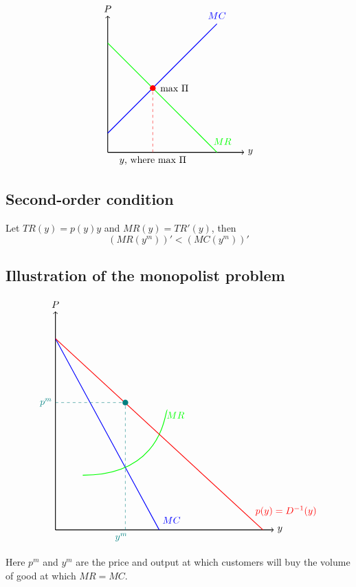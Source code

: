 \documentclass[a4paper, 10pt]{article}
\begin{document}
$$\begin{tikzpicture}[scale=2]

    \draw[thick,->] (0,0) -- (2.5,0) node[right] {$y$}; 
    \draw[thick,->] (0,0) -- (0,2.5) node[above] {$P$}; 

    \draw[thick, green] (0,2) -- (2,0);
    \draw[thick, blue] (0,0.35) -- (2,2.35);
    
    \fill[red] (0.825,1.175) circle (1.5pt);
    \node[anchor=west, black] at (0.9,1.175) {max $\Pi$};

    \draw[dashed, red] (0.825,0) -- (0.825,1.175);

    \node[black] at (0.825,-0.15) {$y$, where max $\Pi$};
    \node[blue] at (2,2.5) {$MC$};
    \node[green] at (2.1,0.2) {$MR$};

\end{tikzpicture}$$
\subsection{Second-order condition}
Let $TR(y)=p(y)y$ and $MR(y)=TR'(y)$, then
\begin{equation}
    \left(MR(y^m)\right)'<\left(MC(y^m)\right)'
\end{equation}
\subsection{Illustration of the monopolist problem}
$$
\begin{tikzpicture}[scale=2]

    \draw[thick,->] (0,0) -- (4,0) node[right] {$y$}; 
    \draw[thick,->] (0,0) -- (0,4) node[above] {$P$};

    \draw[thick, blue] (0,3.5) -- (1.9,0); %
    \draw[thick, green] (0.5,1) .. controls (2,1) and (2,2.2) .. (2.05,2.2); %
    \draw[thick, red] (0,3.5) -- (3.8,0);

    \fill[teal] (1.28,2.33) circle (1.5pt);


    \draw[dashed, teal] (1.28,0) -- (1.28,2.33);
    \draw[dashed, teal] (0,2.33) -- (1.28,2.33);
    \node[anchor=east, teal] at (0,2.33) {$p^m$};
    \node[anchor=north east, teal] at (1.38,0) {$y^m$};
    \node[anchor=north west, blue] at (1.9,0.3) {$MC$};
    \node[anchor=north west, red] at (3.6,0.5) {$p(y)=D^{-1}(y)$};
    \node[green] at (2.2,2.1) {$MR$};
    
\end{tikzpicture}
$$

Here $p^m$ and $y^m$ are the price and output at which customers will buy the volume of good at which $MR=MC$.
\end{document}
